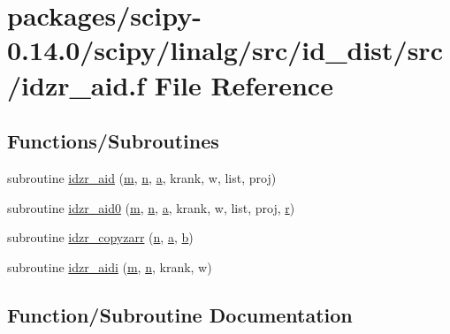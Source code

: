 \hypertarget{idzr__aid_8f}{}\section{packages/scipy-\/0.14.0/scipy/linalg/src/id\+\_\+dist/src/idzr\+\_\+aid.f File Reference}
\label{idzr__aid_8f}
\subsection*{Functions/\+Subroutines}
\begin{DoxyCompactItemize}
\item 
subroutine \hyperlink{idzr__aid_8f_a12172813268e4900ce38c55c745f30fd}{idzr\+\_\+aid} (\hyperlink{indexexpr_8h_ab72fdb4031d47b75ab26dd18a437bcdc}{m}, \hyperlink{indexexpr_8h_ab427e2e2b4d6cec55fa088ea2a692ace}{n}, \hyperlink{gen__mat5files_8m_aae328bf20413f220e38aec4d95bfd6da}{a}, krank, w, list, proj)
\item 
subroutine \hyperlink{idzr__aid_8f_a4bada6a32d244a89118d1ab172a1f8da}{idzr\+\_\+aid0} (\hyperlink{indexexpr_8h_ab72fdb4031d47b75ab26dd18a437bcdc}{m}, \hyperlink{indexexpr_8h_ab427e2e2b4d6cec55fa088ea2a692ace}{n}, \hyperlink{gen__mat5files_8m_aae328bf20413f220e38aec4d95bfd6da}{a}, krank, w, list, proj, \hyperlink{indexexpr_8h_ac434fd11cc2493608d8d91424d60c17e}{r})
\item 
subroutine \hyperlink{idzr__aid_8f_a78fcb5d1f787b3f7085286019022090c}{idzr\+\_\+copyzarr} (\hyperlink{indexexpr_8h_ab427e2e2b4d6cec55fa088ea2a692ace}{n}, \hyperlink{gen__mat5files_8m_aae328bf20413f220e38aec4d95bfd6da}{a}, \hyperlink{gen__mat5files_8m_a7b38767b3b6a8dae167e5afa4fc340b0}{b})
\item 
subroutine \hyperlink{idzr__aid_8f_ae122adef2a86958931d8b2c9d658bc8a}{idzr\+\_\+aidi} (\hyperlink{indexexpr_8h_ab72fdb4031d47b75ab26dd18a437bcdc}{m}, \hyperlink{indexexpr_8h_ab427e2e2b4d6cec55fa088ea2a692ace}{n}, krank, w)
\end{DoxyCompactItemize}


\subsection{Function/\+Subroutine Documentation}
\hypertarget{idzr__aid_8f_a12172813268e4900ce38c55c745f30fd}{}
